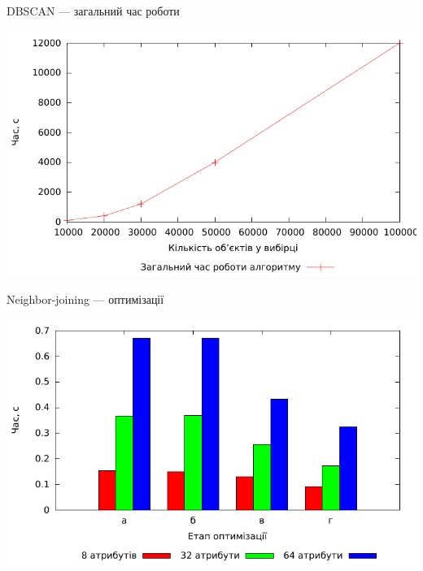 \documentclass{beamer}
\begin{document}
    \begin{frame}{DBSCAN --- загальний час роботи}
        \begin{center}
            \includegraphics[scale=0.8]{dbscan_complexity.pdf}
        \end{center}
    \end{frame}    
    
        
    \begin{frame}{Neighbor-joining --- оптимізації}
        \begin{center}
            \includegraphics[scale=0.8]{nj_compare.pdf}
        \end{center}
    \end{frame}
    
\end{document}
